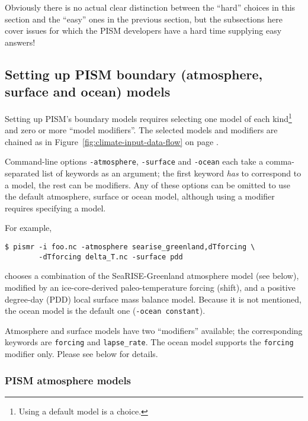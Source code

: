 Obviously there is no actual clear distinction between the ``hard'' choices in this section and the ``easy'' ones in the previous section, but the subsections here cover issues for which the PISM developers have a hard time supplying easy answers!

\subsection{Setting up PISM boundary (atmosphere, surface and ocean) models}
\label{sec:boundary-models}

Setting up PISM's boundary models requires selecting one model of each kind\footnote{Using a default model is a choice.} and zero or more ``model modifiers''.  The selected models and modifiers are chained as in Figure~\ref{fig:climate-input-data-flow} on page \pageref{fig:climate-input-data-flow}.

Command-line options \texttt{-atmosphere}, \texttt{-surface} and \texttt{-ocean} each take a comma-separated list of keywords as an argument; the first keyword \emph{has} to correspond to a model, the rest can be modifiers. Any of these options can be omitted to use the default atmosphere, surface or ocean model, although using a modifier requires specifying a model.

For example,
\begin{verbatim}
$ pismr -i foo.nc -atmosphere searise_greenland,dTforcing \
        -dTforcing delta_T.nc -surface pdd
\end{verbatim}%
chooses a combination of the SeaRISE-Greenland atmosphere model (see below), modified by an ice-core-derived paleo-temperature forcing (shift), and a positive degree-day (PDD) local surface mass balance model.  Because it is not mentioned, the ocean model is the default one (\texttt{-ocean constant}).

Atmosphere and surface models have two ``modifiers'' available; the corresponding keywords are \texttt{forcing} and \texttt{lapse_rate}. The ocean model supports the \texttt{forcing} modifier only. Please see below for details.

\subsubsection{PISM atmosphere models}
\label{sec:pism-atmosphere}

